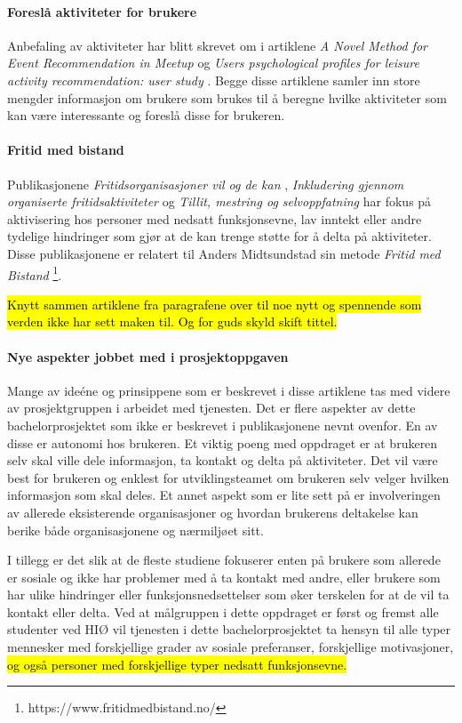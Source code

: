 \paragraph{Foreslå aktiviteter for brukere}
Anbefaling av aktiviteter har blitt skrevet om i artiklene {\em A Novel Method for Event Recommendation in Meetup} \cite{MEETUP:7:ASONAM17} og {\em Users psychological profiles for leisure activity recommendation: user study} \cite{PROFILES:10:CITREC17}. Begge disse artiklene samler inn store mengder informasjon om brukere som brukes til å beregne hvilke aktiviteter som kan være interessante og foreslå disse for brukeren.

\paragraph{Fritid med bistand}
Publikasjonene {\em Fritidsorganisasjoner vil og de kan} \cite{FRITID:12}, {\em Inkludering gjennom organiserte fritidsaktiviteter} \cite{INKLUDERING:11} og {\em Tillit, mestring og selvoppfatning} \cite{TILLIT:13} har fokus på aktivisering hos personer med nedsatt funksjonsevne, lav inntekt eller andre tydelige hindringer som gjør at de kan trenge støtte for å delta på aktiviteter. Disse publikasjonene er relatert til Anders Midtsundstad sin metode {\em Fritid med Bistand} \footnote{https://www.fritidmedbistand.no/}.


\hl{ Knytt sammen artiklene fra paragrafene over til noe nytt og spennende som verden ikke har sett maken til. Og for guds skyld skift tittel.}
\paragraph{Nye aspekter jobbet med i prosjektoppgaven}

Mange av ideéne og prinsippene som er beskrevet i disse artiklene tas med videre av prosjektgruppen i arbeidet med tjenesten. Det er flere aspekter av dette bachelorprosjektet som ikke er beskrevet i publikasjonene nevnt ovenfor. En av disse er autonomi hos brukeren. Et viktig poeng med oppdraget er at brukeren selv skal ville dele informasjon, ta kontakt og delta på aktiviteter. Det vil være best for brukeren og enklest for utviklingsteamet om brukeren selv velger hvilken informasjon som skal deles. Et annet aspekt som er lite sett på er involveringen av allerede eksisterende organisasjoner og hvordan brukerens deltakelse kan berike både organisasjonene og nærmiljøet sitt. 

I tillegg er det slik at de fleste studiene fokuserer enten på brukere som allerede er sosiale og ikke har problemer med å ta kontakt med andre, eller brukere som har ulike hindringer eller funksjonsnedsettelser som øker terskelen for at de vil ta kontakt eller delta. Ved at målgruppen i dette oppdraget er først og fremst alle studenter ved HIØ vil tjenesten i dette bachelorprosjektet ta hensyn til alle typer mennesker med forskjellige grader av sosiale preferanser, forskjellige motivasjoner, \hl{og også personer med forskjellige typer nedsatt funksjonsevne.}

